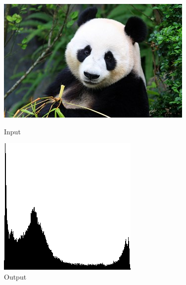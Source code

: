 \documentclass[a4paper,8pt]{article}
\begin{document}
        \begin{figure}[H]
        \centering
        \begin{minipage}{0.4\linewidth}
        \centering
        \includegraphics[width=\linewidth]{output/input1.jpg}
        \caption{Input}
        \end{minipage}
        \hfill
        \begin{minipage}{0.4\linewidth}
        \centering
        \includegraphics[width=\linewidth]{output/Histogram Find_output.png}
        \caption{Output}
        \end{minipage}
        \end{figure}
        \clearpage
        
\end{document}
